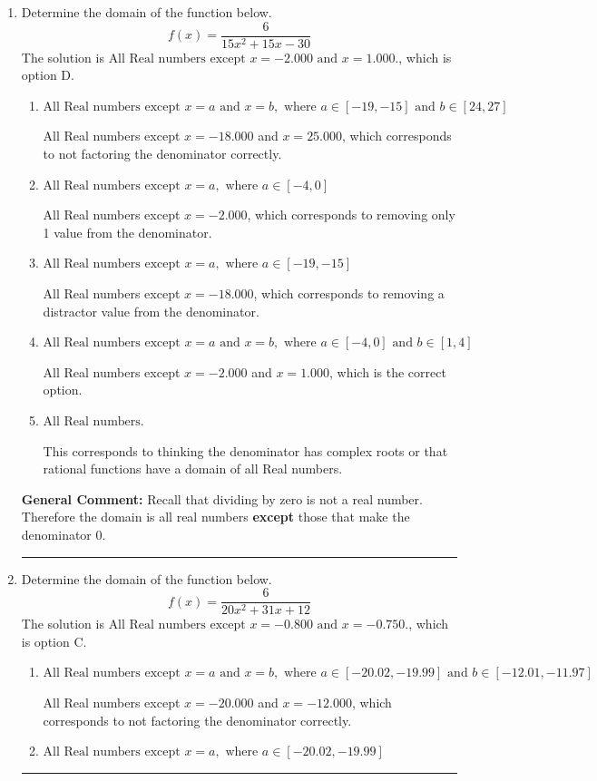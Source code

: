 \documentclass{extbook}[14pt]
\newcommand{\litem}[1]{\item #1

\rule{\textwidth}{0.4pt}}
\begin{document}
\begin{enumerate}\litem{
Determine the domain of the function below.
\[ f(x) = \frac{6}{15x^{2} +15 x -30} \]The solution is \( \text{All Real numbers except } x = -2.000 \text{ and } x = 1.000. \), which is option D.\begin{enumerate}[label=\Alph*.]
\item \( \text{All Real numbers except } x = a \text{ and } x = b, \text{ where } a \in [-19, -15] \text{ and } b \in [24, 27] \)

All Real numbers except $x = -18.000$ and $x = 25.000$, which corresponds to not factoring the denominator correctly.
\item \( \text{All Real numbers except } x = a, \text{ where } a \in [-4, 0] \)

All Real numbers except $x = -2.000$, which corresponds to removing only 1 value from the denominator.
\item \( \text{All Real numbers except } x = a, \text{ where } a \in [-19, -15] \)

All Real numbers except $x = -18.000$, which corresponds to removing a distractor value from the denominator.
\item \( \text{All Real numbers except } x = a \text{ and } x = b, \text{ where } a \in [-4, 0] \text{ and } b \in [1, 4] \)

All Real numbers except $x = -2.000$ and $x = 1.000$, which is the correct option.
\item \( \text{All Real numbers.} \)

This corresponds to thinking the denominator has complex roots or that rational functions have a domain of all Real numbers.
\end{enumerate}

\textbf{General Comment:} Recall that dividing by zero is not a real number. Therefore the domain is all real numbers \textbf{except} those that make the denominator 0.
}
\litem{
Determine the domain of the function below.
\[ f(x) = \frac{6}{20x^{2} +31 x + 12} \]The solution is \( \text{All Real numbers except } x = -0.800 \text{ and } x = -0.750. \), which is option C.\begin{enumerate}[label=\Alph*.]
\item \( \text{All Real numbers except } x = a \text{ and } x = b, \text{ where } a \in [-20.02, -19.99] \text{ and } b \in [-12.01, -11.97] \)

All Real numbers except $x = -20.000$ and $x = -12.000$, which corresponds to not factoring the denominator correctly.
\item \( \text{All Real numbers except } x = a, \text{ where } a \in [-20.02, -19.99] \)


\end{enumerate}}
\end{enumerate}
\end{document}
